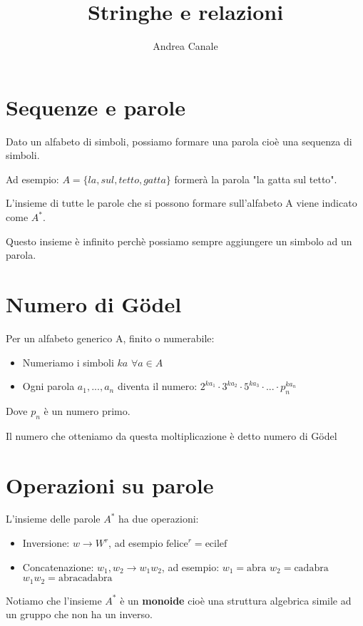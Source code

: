 \documentclass[a4paper]{article}
\title{Stringhe e relazioni}
\author{Andrea Canale}
\begin{document}
\maketitle
\tableofcontents
\section{Sequenze e parole}
Dato un alfabeto di simboli, possiamo formare una parola cioè una sequenza di simboli.

Ad esempio: $A=\{la, sul, tetto, gatta\}$ formerà la parola "la gatta sul tetto".

L'insieme di tutte le parole che si possono formare sull'alfabeto A viene indicato come $A^*$.

Questo insieme è infinito perchè possiamo sempre aggiungere un simbolo ad un parola.

\section{Numero di Gödel}

Per un alfabeto generico A, finito o numerabile:

\begin{itemize}
	\item Numeriamo i simboli $ka$ $\forall a \in A$
	\item Ogni parola $a_1, ..., a_n$  diventa il numero: $2^{ka_1} \cdot 3^{ka_2} \cdot 5^{ka_3} \cdot ... \cdot p_n^{ka_n}$
\end{itemize}

Dove $p_n$ è un numero primo.

Il numero che otteniamo da questa moltiplicazione è detto numero di Gödel

\section{Operazioni su parole}

L'insieme delle parole $A^*$ ha due operazioni:

\begin{itemize}
	\item Inversione: $w \rightarrow W^r$, ad esempio $\text{felice}^r=\text{ecilef}$
	\item Concatenazione: $w_1, w_2 \rightarrow w_1w_2$, ad esempio: $w_1=\text{abra}$ $w_2=\text{cadabra}$ $w_1w_2=\text{abracadabra}$
\end{itemize}

Notiamo che l'insieme $A^*$ è un \textbf{monoide} cioè una struttura algebrica simile ad un gruppo che non ha un inverso.
\end{document}
